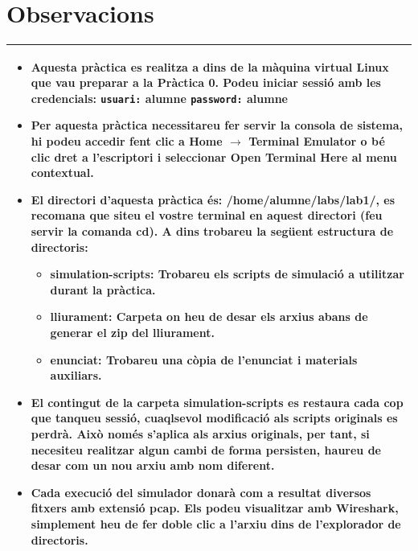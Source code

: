 \documentclass[12pt,a4paper]{article}
\begin{document}
\section*{Observacions}

 \begin{tabular}{||p{12cm}||}
 \hline\hline
 \begin{itemize}
 \item Aquesta pràctica es realitza a dins de la màquina virtual Linux que vau preparar a la Pràctica 0. Podeu iniciar sessió amb les credencials: 
   \newline \texttt{usuari:} \textbf{alumne}
   \newline \texttt{password:} \textbf{alumne}
 \item Per aquesta pràctica necessitareu fer servir la consola de sistema, hi podeu accedir fent clic a \textbf{Home} $\rightarrow$ \textbf{Terminal Emulator} o bé clic dret a l'escriptori i seleccionar \textbf{Open Terminal Here} al menu contextual.
 
 \item El directori d'aquesta pràctica és: \textbf{/home/alumne/labs/lab1/}, es recomana que siteu el vostre terminal en aquest directori (feu servir la comanda \textbf{cd}). A dins trobareu la següent estructura de directoris:
    \begin{itemize}        
        \item\textbf{simulation-scripts}: Trobareu els scripts de simulació a utilitzar durant la pràctica.
        \item\textbf{lliurament}: Carpeta on heu de desar els arxius abans de generar el zip del lliurament.
        \item\textbf{enunciat}: Trobareu una còpia de l'enunciat i materials auxiliars.
    \end{itemize}
 
 \item El contingut de la carpeta \textbf{simulation-scripts} es restaura cada cop que tanqueu sessió, cuaqlsevol modificació als scripts originals es perdrà. Això només s'aplica als arxius originals, per tant, si necesiteu realitzar algun cambi de forma persisten, haureu de desar com un nou arxiu amb nom diferent.
 
 \item Cada execució del simulador donarà com a resultat diversos fitxers amb extensió \textbf{pcap}. Els podeu visualitzar amb \textbf{Wireshark}, simplement heu de fer doble clic a l'arxiu dins de l'explorador de directoris.  
 \end{itemize}
 \\\hline\hline
 \end{tabular}
 \medskip
 
\end{document}
